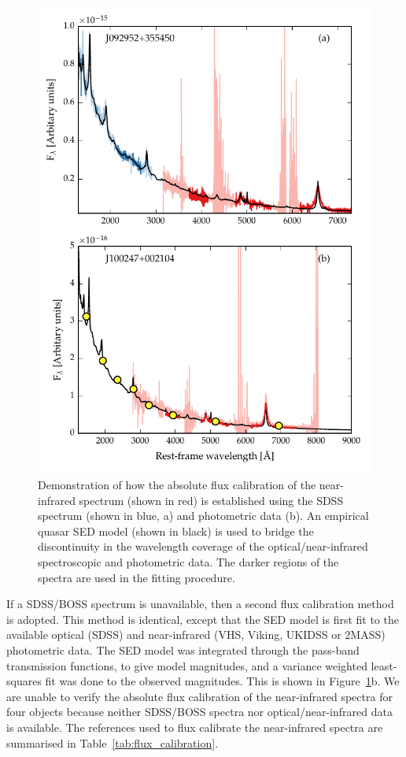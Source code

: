 \begin{figure}
    \centering
    \includegraphics[width=\textwidth]{figures/chapter02/normalise_to_sdss.pdf} 
    \caption[{}]{Demonstration of how the absolute flux calibration of the near-infrared spectrum (shown in red) is established using the SDSS spectrum (shown in blue, a) and photometric data (b). An empirical quasar SED model (shown in black) is used to bridge the discontinuity in the wavelength coverage of the optical/near-infrared spectroscopic and photometric data. The darker regions of the spectra are used in the fitting procedure.}     
    \label{fig:normalise_to_sdss}
\end{figure}

If a SDSS/BOSS spectrum is unavailable, then a second flux calibration method is adopted. 
This method is identical, except that the SED model is first fit to the available optical (SDSS) and near-infrared (VHS, Viking, UKIDSS or 2MASS) photometric data. 
The SED model was integrated through the pass-band transmission functions, to give model magnitudes, and a variance weighted least-squares fit was done to the observed magnitudes. 
This is shown in Figure~\ref{fig:normalise_to_sdss}b. 
We are unable to verify the absolute flux calibration of the near-infrared spectra for four objects because neither SDSS/BOSS spectra nor optical/near-infrared data is available. 
The references used to flux calibrate the near-infrared spectra are summarised in Table~\ref{tab:flux_calibration}. 


